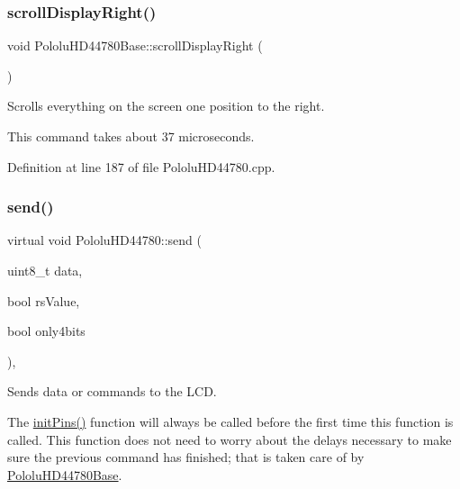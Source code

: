 \mbox{\label{class_pololu_h_d44780_base_a411512707f303af75de3c5aea313bf48}} 
\subsubsection{\texorpdfstring{scroll\+Display\+Right()}{scrollDisplayRight()}}
{\footnotesize\ttfamily void Pololu\+H\+D44780\+Base\+::scroll\+Display\+Right (\begin{DoxyParamCaption}{ }\end{DoxyParamCaption})\hspace{0.3cm}{\ttfamily [inherited]}}

Scrolls everything on the screen one position to the right.

This command takes about 37 microseconds. 

Definition at line 187 of file Pololu\+H\+D44780.\+cpp.

\mbox{\label{class_pololu_h_d44780_a8da2db526de9f1e2314cb02c3ba6121a}} 
\subsubsection{\texorpdfstring{send()}{send()}}
{\footnotesize\ttfamily virtual void Pololu\+H\+D44780\+::send (\begin{DoxyParamCaption}\item[{uint8\+\_\+t}]{data,  }\item[{bool}]{rs\+Value,  }\item[{bool}]{only4bits }\end{DoxyParamCaption})\hspace{0.3cm}{\ttfamily [inline]}, {\ttfamily [virtual]}}

Sends data or commands to the L\+CD.

The \hyperlink{class_pololu_h_d44780_a876723b26f2dc081bf7f29019079489b}{init\+Pins()} function will always be called before the first time this function is called. This function does not need to worry about the delays necessary to make sure the previous command has finished; that is taken care of by \hyperlink{class_pololu_h_d44780_base}{Pololu\+H\+D44780\+Base}.

